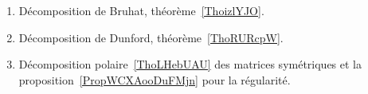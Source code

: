 
   \label{DECooWTAIooNkZAFg}
\begin{enumerate}
	\item
	      Décomposition de Bruhat, théorème~\ref{ThoizlYJO}.
	\item
	      Décomposition de Dunford, théorème~\ref{ThoRURcpW}.
	\item
	      Décomposition polaire~\ref{ThoLHebUAU} des matrices symétriques et la proposition~\ref{PropWCXAooDuFMjn} pour la régularité.
\end{enumerate}

